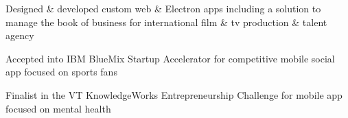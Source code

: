 \documentclass[]{resume}
\begin{document}
\begin{minipage}[t]{0.55\textwidth}
\begin{tightemize}
\item Designed \& developed custom web \& Electron apps including a solution to manage the book of business for international film \& tv production \& talent agency
\item Accepted into IBM BlueMix Startup Accelerator for competitive mobile social app focused on sports fans
\item Finalist in the VT KnowledgeWorks Entrepreneurship Challenge for mobile app focused on mental health 
\end{tightemize}
\sectionsep


\end{minipage} 
\end{document}
